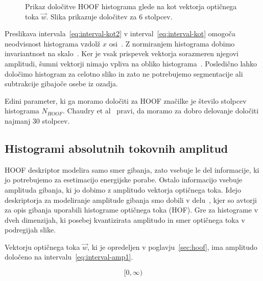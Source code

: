 \begin{figure}[htb]
\centering
\resizebox{0.5\columnwidth}{!}{}
\caption[Prikaz določitve HOOF histograma glede na kot vektorja]{Prikaz določitve HOOF histograma glede na kot vektorja optičnega toka $\vec{w}$. Slika prikazuje določitev za $6$ stolpcev.}
\label{fig:hoof-histogram}
\end{figure}




Preslikava intervala~\eqref{eq:interval-kot2} v interval~\eqref{eq:interval-kot} omogoča neodvisnost histograma vzdolž $x$ osi~\cite{chaudhry2009histograms}. Z normiranjem histograma dobimo invariantnost na skalo~\cite{chaudhry2009histograms}. Ker je vsak prispevek vektorja sorazmeren njegovi amplitudi, šumni vektorji nimajo vpliva na obliko histograma~\cite{chaudhry2009histograms}. Posledično lahko določimo histogram za celotno sliko in zato ne potrebujemo segmentacije ali subtrakcije gibajoče osebe iz ozadja. 

Edini parameter, ki ga moramo določiti za HOOF značilke je število stolpcev histograma $N_{HOOF}$. Chaudry et al~\cite{chaudhry2009histograms} pravi, da moramo za dobro delovanje določiti najmanj $30$ stolpcev. 







\subsection{Histogrami absolutnih tokovnih amplitud}\label{sec:hafa}
HOOF deskriptor modelira samo smer gibanja, zato vsebuje le del informacije, ki jo potrebujemo za esetimacijo energijske porabe. Ostalo informacijo vsebuje amplituda gibanja, ki jo dobimo z amplitudo vektorja optičnega toka. Idejo deskriptorja za modeliranje amplitude gibanja smo dobili v delu~\cite{pers2010histograms}, kjer so avtorji za opis gibanja uporabili histograme optičnega toka (HOF). Gre za histograme v dveh dimenzijah, ki posebej kvantizirata amplitudo in smer optičnega toka v podregijah slike. 

Vektorju optičnega toka $\vec{w}$, ki je opredeljen v poglavju~\ref{sec:hoof}, ima amplitudo določeno na intervalu~\eqref{eq:interval-amp1}. 

\begin{equation}\label{eq:interval-amp1}
	[0, \infty)
\end{equation}


